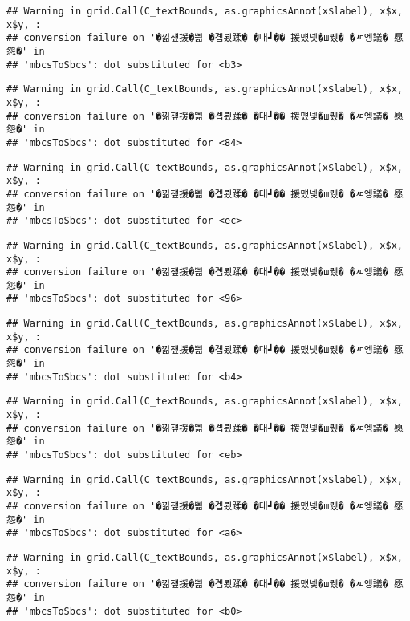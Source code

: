 \documentclass[
]{article}
\begin{document}
\begin{verbatim}
## Warning in grid.Call(C_textBounds, as.graphicsAnnot(x$label), x$x, x$y, :
## conversion failure on '�낆쟾援�쁾 �곕룄蹂� �대┛�� 援먰넻�ш퀬� �ㅼ엥議� 愿怨�' in
## 'mbcsToSbcs': dot substituted for <b3>
\end{verbatim}

\begin{verbatim}
## Warning in grid.Call(C_textBounds, as.graphicsAnnot(x$label), x$x, x$y, :
## conversion failure on '�낆쟾援�쁾 �곕룄蹂� �대┛�� 援먰넻�ш퀬� �ㅼ엥議� 愿怨�' in
## 'mbcsToSbcs': dot substituted for <84>
\end{verbatim}

\begin{verbatim}
## Warning in grid.Call(C_textBounds, as.graphicsAnnot(x$label), x$x, x$y, :
## conversion failure on '�낆쟾援�쁾 �곕룄蹂� �대┛�� 援먰넻�ш퀬� �ㅼ엥議� 愿怨�' in
## 'mbcsToSbcs': dot substituted for <ec>
\end{verbatim}

\begin{verbatim}
## Warning in grid.Call(C_textBounds, as.graphicsAnnot(x$label), x$x, x$y, :
## conversion failure on '�낆쟾援�쁾 �곕룄蹂� �대┛�� 援먰넻�ш퀬� �ㅼ엥議� 愿怨�' in
## 'mbcsToSbcs': dot substituted for <96>
\end{verbatim}

\begin{verbatim}
## Warning in grid.Call(C_textBounds, as.graphicsAnnot(x$label), x$x, x$y, :
## conversion failure on '�낆쟾援�쁾 �곕룄蹂� �대┛�� 援먰넻�ш퀬� �ㅼ엥議� 愿怨�' in
## 'mbcsToSbcs': dot substituted for <b4>
\end{verbatim}

\begin{verbatim}
## Warning in grid.Call(C_textBounds, as.graphicsAnnot(x$label), x$x, x$y, :
## conversion failure on '�낆쟾援�쁾 �곕룄蹂� �대┛�� 援먰넻�ш퀬� �ㅼ엥議� 愿怨�' in
## 'mbcsToSbcs': dot substituted for <eb>
\end{verbatim}

\begin{verbatim}
## Warning in grid.Call(C_textBounds, as.graphicsAnnot(x$label), x$x, x$y, :
## conversion failure on '�낆쟾援�쁾 �곕룄蹂� �대┛�� 援먰넻�ш퀬� �ㅼ엥議� 愿怨�' in
## 'mbcsToSbcs': dot substituted for <a6>
\end{verbatim}

\begin{verbatim}
## Warning in grid.Call(C_textBounds, as.graphicsAnnot(x$label), x$x, x$y, :
## conversion failure on '�낆쟾援�쁾 �곕룄蹂� �대┛�� 援먰넻�ш퀬� �ㅼ엥議� 愿怨�' in
## 'mbcsToSbcs': dot substituted for <b0>
\end{verbatim}
\end{document}
